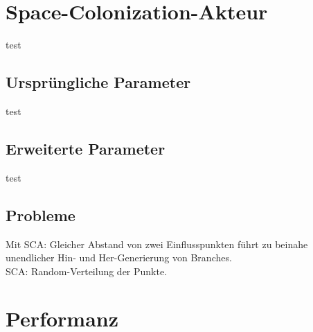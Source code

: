 \section{Space-Colonization-Akteur}
test
\subsection{Ursprüngliche Parameter}
test
\subsection{Erweiterte Parameter}
test

\subsection{Probleme}
Mit SCA: Gleicher Abstand von zwei Einflusspunkten führt zu beinahe unendlicher Hin- und Her-Generierung von Branches.
\\
SCA: Random-Verteilung der Punkte.

\section{Performanz}


